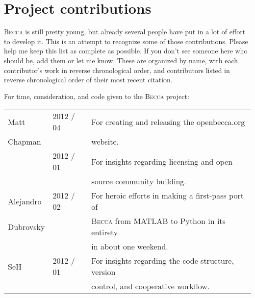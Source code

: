 \chapter{Project contributions}

\textsc{Becca} is still pretty young, but already several people have put in a lot of effort to develop it. This is an attempt to recognize some of those contributions. Please help me keep this list as complete as possible. If you don't see someone here who should be, add them or let me know. These are organized by name, with each contributor's work in reverse chronological order, and contributors listed in reverse chronological order of their most recent citation.

For time, consideration, and code given to the \textsc{Becca} project:

\begin{tabular}{|l|l|l|}
\hline
Matt & 2012 / 04 & For creating and releasing the openbecca.org \\
Chapman &&website. \\
& 2012 / 01 & For insights regarding licensing and open \\
&&source community building. \\
\hline
Alejandro &2012 / 02& For heroic efforts in making a first-pass port of \\
Dubrovsky&&\textsc{Becca} from MATLAB to Python in its entirety \\
 && in about one weekend.\\
\hline
SeH & 2012 / 01& For insights regarding the code structure, version \\
&&control, and cooperative workflow.\\
\hline
\end{tabular}
